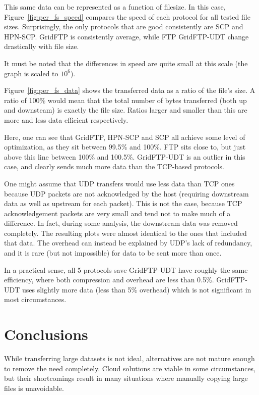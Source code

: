 \documentclass{sig-alternate-05-2015}
\begin{document}
This same data can be represented as a function of filesize. In this case, Figure~\ref{fig:per_fs_speed} compares the speed of each protocol for all tested file sizes. Surprisingly, the only protocols that are good consistently are SCP and HPN-SCP. GridFTP is consistently average, while FTP GridFTP-UDT change drastically with file size. 

It must be noted that the differences in speed are quite small at this scale (the graph is scaled to $10^6$).

Figure~\ref{fig:per_fs_data} shows the transferred data as a ratio of the file's size. A ratio of 100\% would mean that the total number of bytes transferred (both up and downsteam) is exactly the file size. Ratios larger and smaller than this are more and less data efficient respectively.

Here, one can see that GridFTP, HPN-SCP and SCP all achieve some level of optimization, as they sit between 99.5\% and 100\%. FTP sits close to, but just above this line between 100\% and 100.5\%. GridFTP-UDT is an outlier in this case, and clearly sends much more data than the TCP-based protocols.

One might assume that UDP transfers would use less data than TCP ones because UDP packets are not acknowledged by the host (requiring downstream data as well as upstream for each packet). This is not the case, because TCP acknowledgement packets are very small and tend not to make much of a difference. In fact, during some analysis, the downstream data was removed completely. The resulting plots were almost identical to the ones that included that data. The overhead can instead be explained by UDP's lack of redundancy, and it is rare (but not impossible) for data to be sent more than once.

In a practical sense, all 5 protocols save GridFTP-UDT have roughly the same efficiency, where both compression and overhead are less than 0.5\%. GridFTP-UDT uses slightly more data (less than 5\% overhead) which is not significant in most circumstances.

\section{Conclusions}
While transferring large datasets is not ideal, alternatives are not mature enough to remove the need completely. Cloud solutions are viable in some circumstances, but their shortcomings result in many situations where manually copying large files is unavoidable.
\end{document}
